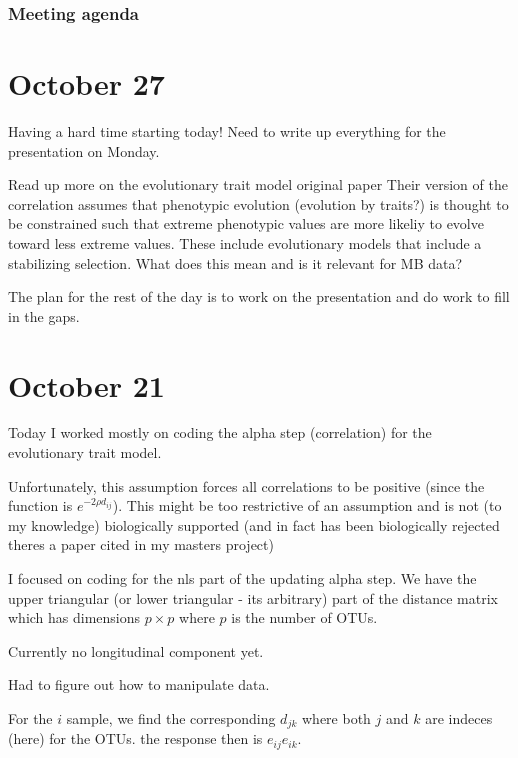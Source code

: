 \documentclass[10pt]{article}
\begin{document}
\subsubsection*{Meeting agenda}

\hrulefill

\section{October 27}

Having a hard time starting today! Need to write up everything for the presentation on Monday.

Read up more on the evolutionary trait model original paper \cite{Martins1997}
Their version of the correlation assumes that phenotypic evolution (evolution by traits?) is thought to be constrained such that extreme phenotypic values are more likeliy to evolve toward less extreme values. These include evolutionary models that include a stabilizing selection. What does this mean and is it relevant for MB data?

The plan for the rest of the day is to work on the presentation and do work to fill in the gaps.



\section{October 21}


Today I worked mostly on coding the alpha step (correlation) for the evolutionary trait model.

Unfortunately, this assumption forces all correlations to be positive (since the function is $e^{-2\rho d_{ij}}$). This might be too restrictive of an assumption and is not (to my knowledge) biologically supported (and in fact has been biologically rejected theres a paper cited in my masters project)

I focused on coding for the nls part of the updating alpha step. We have the upper triangular (or lower triangular - its arbitrary) part of the distance matrix which has dimensions $p \times p$ where $p$ is the number of OTUs.

Currently no longitudinal component yet.

Had to figure out how to manipulate data.

For the $i$ sample, we find the corresponding $d_{jk}$ where both $j$ and  $k$ are indeces (here) for the OTUs. the response then is $e_{ij}e_{ik}$.
\end{document}
